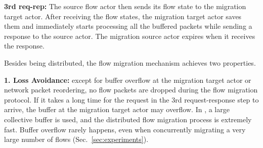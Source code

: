 \textbf{3rd req-rep:} The source flow actor then sends its flow state to the migration target actor. After receiving the flow states, the migration target actor saves them and immediately starts processing all the buffered packets while sending a response to the source actor. The migration source actor expires when it receives the response.


Besides being distributed, the flow migration mechanism achieves two properties. %

\textbf{1. Loss Avoidance:} except for buffer overflow at the migration target actor or network packet reordering, no flow packets are dropped during the flow migration protocol. %
If it takes a long time for the request in the 3rd request-response step to arrive, the buffer at the migration target actor may overflow. %
 In \nfactor, a large collective buffer is used, and the distributed flow migration process is extremely fast. Buffer overflow rarely happens, even when concurrently migrating a very large number of flows (Sec.~\ref{sec:experiments}).

